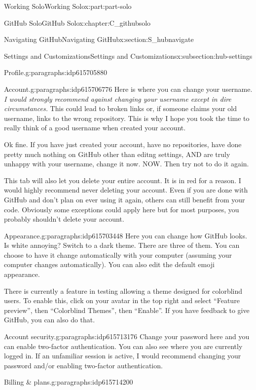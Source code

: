 \documentclass[oneside,10pt,]{book}
\begin{document}
\begin{partptx}{Working Solo}{}{Working Solo}{}{}{x:part:part-solo}
\begin{chapterptx}{GitHub Solo}{}{GitHub Solo}{}{}{x:chapter:C_githubsolo}
\begin{sectionptx}{Navigating GitHub}{}{Navigating GitHub}{}{}{x:section:S_hubnavigate}
\begin{subsectionptx}{Settings and Customizations}{}{Settings and Customizations}{}{}{x:subsection:hub-settings}
\begin{paragraphs}{Profile.}{g:paragraphs:idp615705880}
\end{paragraphs}%
\begin{paragraphs}{Account.}{g:paragraphs:idp615706776}%
%
Here is where you can change your username. \emph{I would strongly recommend against changing your username except in dire circumstances.} This could lead to broken links or, if someone claims your old username, links to the wrong repository. This is why I hope you took the time to really think of a good username when created your account.%
\par
Ok fine. If you have just created your account, have no repositories, have done pretty much nothing on GitHub other than editng settings, AND are truly unhappy with your username, change it now. NOW. Then try not to do it again.%
\par
This tab will also let you delete your entire account. It is in red for a reason. I would highly recommend never deleting your account. Even if you are done with GitHub and don't plan on ever using it again, others can still benefit from your code. Obviously some exceptions could apply here but for most purposes, you probably shouldn't delete your account.%
\end{paragraphs}%
\begin{paragraphs}{Appearance.}{g:paragraphs:idp615703448}%
%
Here you can change how GitHub looks. Is white annoying? Switch to a dark theme. There are three of them. You can choose to have it change automatically with your computer (assuming your computer changes automatically). You can also edit the default emoji appearance.%
\par
There is currently a feature in testing allowing a theme designed for colorblind users. To enable this, click on your avatar in the top right and select ``Feature preview'', then ``Colorblind Themes'', then ``Enable''. If you have feedback to give GitHub, you can also do that.%
\end{paragraphs}%
\begin{paragraphs}{Account security.}{g:paragraphs:idp615713176}%
%
Change your password here and you can enable two-factor authentication. You can also see where you are currently logged in. If an unfamiliar session is active, I would recommend changing your password and\slash{}or enabling two-factor authentication.%
\end{paragraphs}%
\begin{paragraphs}{Billing \& plans.}{g:paragraphs:idp615714200}%
%

\end{paragraphs}
\end{subsectionptx}
\end{sectionptx}
\end{chapterptx}
\end{partptx}
\end{document}
